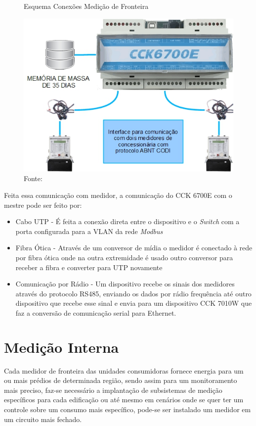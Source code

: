 \begin{figure}[H]
    \centering
    \caption{Esquema Conexões Medição de Fronteira}
    \includegraphics[width=0.8\linewidth]{imagens/cck6700e-esquema.jpg}
    \caption*{Fonte: }
    \label{fig:my_label}
\end{figure}

Feita essa comunicação com medidor, a comunicação do CCK 6700E com o mestre pode ser feito por:
\begin{itemize}
    \item Cabo UTP - É feita a conexão direta entre o dispositivo e o \textit{Switch} com a porta configurada para a VLAN da rede \textit{Modbus}
    \item Fibra Ótica - Através de um conversor de mídia o medidor é conectado à rede por fibra ótica onde na outra extremidade é usado outro conversor para receber a fibra e converter para UTP novamente
    \item Comunicação por Rádio - Um dispositivo recebe os sinais dos medidores através do protocolo RS485, enviando os dados por rádio frequência até outro dispositivo que recebe esse sinal e envia para um dispositivo CCK 7010W que faz a conversão de comunicação serial para Ethernet.
\end{itemize}

\section{Medição Interna}

Cada medidor de fronteira das unidades consumidoras fornece energia para um ou mais prédios de determinada região, sendo assim para um monitoramento mais preciso, faz-se necessário a implantação de subsistemas de medição específicos para cada edificação ou até mesmo em cenários onde se quer ter um controle sobre um consumo mais específico, pode-se ser instalado um medidor em um circuito mais fechado.

